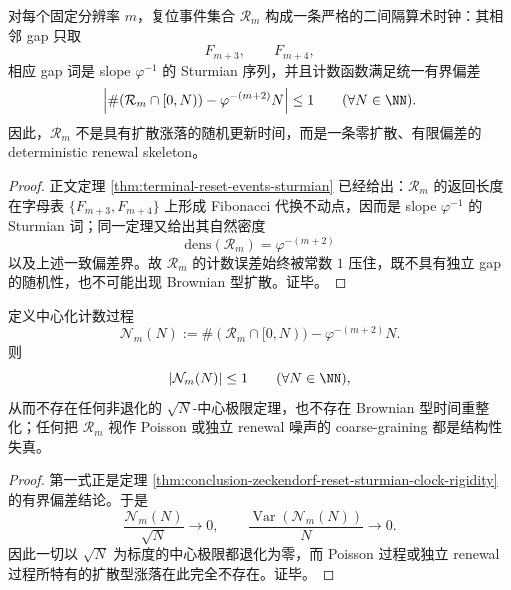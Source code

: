 \begin{theorem}\label{thm:conclusion-zeckendorf-reset-sturmian-clock-rigidity}
对每个固定分辨率 \(m\)，复位事件集合 \(\mathcal R_m\) 构成一条严格的二间隔算术时钟：其相邻 gap 只取
\[
F_{m+3},\qquad F_{m+4},
\]
相应 gap 词是 slope \(\varphi^{-1}\) 的 Sturmian 序列，并且计数函数满足统一有界偏差
\[
\left|\#(\mathcal R_m\cap[0,N))-\varphi^{-(m+2)}N\right|\le 1
\qquad(\forall N\in\NN).
\]
因此，\(\mathcal R_m\) 不是具有扩散涨落的随机更新时间，而是一条零扩散、有限偏差的 deterministic renewal skeleton。
\end{theorem}
\begin{proof}
正文定理 \ref{thm:terminal-reset-events-sturmian} 已经给出：\(\mathcal R_m\) 的返回长度在字母表 \(\{F_{m+3},F_{m+4}\}\) 上形成 Fibonacci 代换不动点，因而是 slope \(\varphi^{-1}\) 的 Sturmian 词；同一定理又给出其自然密度
\[
\mathrm{dens}(\mathcal R_m)=\varphi^{-(m+2)}
\]
以及上述一致偏差界。故 \(\mathcal R_m\) 的计数误差始终被常数 \(1\) 压住，既不具有独立 gap 的随机性，也不可能出现 Brownian 型扩散。证毕。
\end{proof}

\begin{corollary}\label{cor:conclusion-zeckendorf-reset-no-central-limit}
定义中心化计数过程
\[
\mathcal N_m(N):=\#(\mathcal R_m\cap[0,N))-\varphi^{-(m+2)}N.
\]
则
\[
|\mathcal N_m(N)|\le 1
\qquad(\forall N\in\NN),
\]
从而不存在任何非退化的 \(\sqrt N\)-中心极限定理，也不存在 Brownian 型时间重整化；任何把 \(\mathcal R_m\) 视作 Poisson 或独立 renewal 噪声的 coarse-graining 都是结构性失真。
\end{corollary}
\begin{proof}
第一式正是定理 \ref{thm:conclusion-zeckendorf-reset-sturmian-clock-rigidity} 的有界偏差结论。于是
\[
\frac{\mathcal N_m(N)}{\sqrt N}\longrightarrow 0,
\qquad
\frac{\operatorname{Var}(\mathcal N_m(N))}{N}\longrightarrow 0.
\]
因此一切以 \(\sqrt N\) 为标度的中心极限都退化为零，而 Poisson 过程或独立 renewal 过程所特有的扩散型涨落在此完全不存在。证毕。
\end{proof}

\endinput
